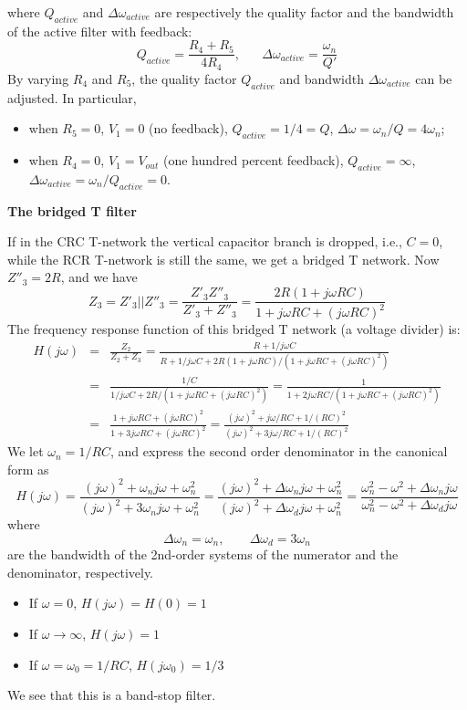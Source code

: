 where $Q_{active}$ and $\Delta\omega_{active}$ are respectively the quality
factor and the bandwidth of the active filter with feedback:
\[
Q_{active}=\frac{R_4+R_5}{4R_4},\;\;\;\;\;\;
\Delta\omega_{active}=\frac{\omega_n}{Q'}
\]
By varying $R_4$ and $R_5$, the quality factor $Q_{active}$ and bandwidth 
$\Delta\omega_{active}$ can be adjusted. In particular, 
\begin{itemize}
\item when $R_5=0$, $V_1=0$ (no feedback), $Q_{active}=1/4=Q$, 
  $\Delta\omega=\omega_n/Q=4\omega_n$; 
\item when $R_4=0$, $V_1=V_{out}$ (one hundred percent feedback), 
  $Q_{active}=\infty$, $\Delta\omega_{active}=\omega_n/Q_{active}=0$.
\end{itemize}


{\bf The bridged T filter}

If in the CRC T-network the vertical capacitor branch is dropped, i.e.,
$C=0$, while the RCR T-network is still the same, we get a bridged T 
network. Now $Z''_3=2R$, and we have
\[
  Z_3=Z'_3||Z''_3=\frac{Z'_3 Z''_3}{Z'_3+Z''_3}
  =\frac{2R(1+j\omega RC)}{1+j\omega RC+(j\omega RC)^2}
\]
The frequency response function of this bridged T network (a voltage 
divider) is:
\begin{eqnarray}
  H(j\omega)&=&\frac{Z_2}{Z_2+Z_3}=\frac{R+1/j\omega C}{R+1/j\omega C+2R(1+j\omega RC)/(1+j\omega RC+(j\omega RC)^2)}
  \nonumber \\
  &=&\frac{1/C}{1/j\omega C+2R/(1+j\omega RC+(j\omega RC)^2)}
  =\frac{1}{1+2j\omega RC/(1+j\omega RC+(j\omega RC)^2)}
  \nonumber \\
  &=&\frac{1+j\omega RC+(j\omega RC)^2}{1+3j\omega RC+(j\omega RC)^2}
  =\frac{(j\omega)^2+j\omega /RC+1/(RC)^2}{(j\omega)^2+3j\omega /RC+1/(RC)^2}
  \nonumber
\end{eqnarray}
We let $\omega_n=1/RC$, and express the second order denominator in the
canonical form as
\[
H(j\omega)=\frac{(j\omega)^2+\omega_n j\omega +\omega_n^2}{(j\omega)^2+3\omega_nj\omega +\omega_n^2}
=\frac{(j\omega)^2+\Delta\omega_n j\omega+\omega_n^2}{(j\omega)^2+\Delta\omega_dj\omega +\omega_n^2}
=\frac{\omega_n^2-\omega^2+\Delta\omega_n j\omega }{\omega_n^2-\omega^2+\Delta\omega_dj\omega}
\]
where 
\[
\Delta\omega_n=\omega_n,\;\;\;\;\;\;\;\Delta\omega_d=3\omega_n
\]
are the bandwidth of the 2nd-order systems of the numerator and the
denominator, respectively. 
\begin{itemize}
\item If $\omega=0$, $H(j\omega)=H(0)=1$
\item If $\omega\rightarrow \infty$, $H(j\omega)=1$
\item If $\omega=\omega_0=1/RC$, $H(j\omega_0)=1/3$
\end{itemize}
We see that this is a band-stop filter.

